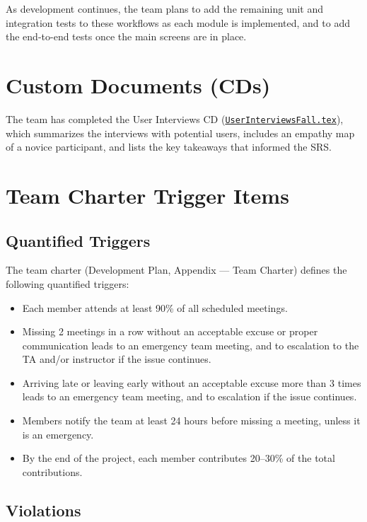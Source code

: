 \documentclass{article}
\begin{document}
As development continues, the team plans to add the remaining unit and
integration tests to these workflows as each module is implemented, and to
add the end-to-end tests once the main screens are in place.

\section{Custom Documents (CDs)}


The team has completed the User Interviews CD
(\href{https://github.com/arjunkarthik123/fitness-finance-application/blob/main/docs/CDs/Interviews/UserInterviewsFall.tex}{\texttt{UserInterviewsFall.tex}}),
which summarizes the interviews with potential users, includes an empathy map
of a novice participant, and lists the key takeaways that informed the SRS.

\section{Team Charter Trigger Items}

\subsection*{Quantified Triggers}

The team charter (Development Plan, Appendix --- Team Charter) defines the
following quantified triggers:
\begin{itemize}
    \item Each member attends at least 90\% of all scheduled meetings.
    \item Missing 2 meetings in a row without an acceptable excuse or proper
    communication leads to an emergency team meeting, and to escalation to the
    TA and/or instructor if the issue continues.
    \item Arriving late or leaving early without an acceptable excuse more
    than 3 times leads to an emergency team meeting, and to escalation if the
    issue continues.
    \item Members notify the team at least 24 hours before missing a meeting,
    unless it is an emergency.
    \item By the end of the project, each member contributes 20--30\% of the
    total contributions.
\end{itemize}

\subsection*{Violations}
\end{document}
